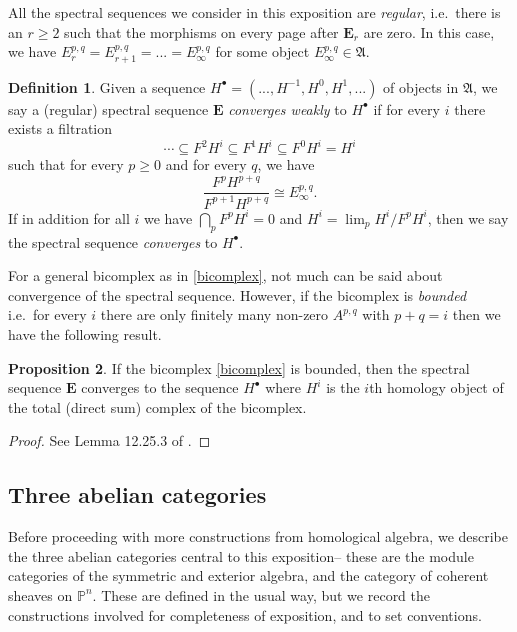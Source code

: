 \documentclass[a4paper]{article}
\theoremstyle{definition}
\newtheorem{defn}{Definition}[section]
\newtheorem{prop}[defn]{Proposition}
\theoremstyle{remark}
\newcommand{\Pn}{\ensuremath{{\mathbb{P}^n}}}
\begin{document}
All the spectral sequences we consider in this exposition are \textit{regular},
i.e.\ there is an \(r\geq 2\) such that the morphisms on every page after
\(\mathbf{E}_r\) are zero. In this case, we have \(E^{p,q}_r = E^{p,q}_{r+1} =
... = E^{p,q}_\infty\) for some object \(E^{p,q}_\infty \in \mathfrak{A}\).

\begin{defn}
    Given a sequence \(H^\bullet=(..., H^{-1},H^0,H^1,...)\) of objects in
    \(\mathfrak{A}\), we say a (regular) spectral sequence \(\mathbf{E}\)
    \textit{converges weakly} to \(H^\bullet\) if for every \(i\) there exists a
    filtration 
    \[\cdots \subseteq F^2H^i \subseteq F^{1}H^i \subseteq F^0H^i =
    H^i \] such that for every \(p\geq 0\) and for every \(q\), we have 
    \[\frac{F^pH^{p+q}}{F^{p+1}H^{p+q}} \cong E^{p,q}_\infty.\]
    If in addition for all \(i\) we have \(\bigcap_pF^pH^i= 0\) and \(H^i =
    \lim_p H^i/F^pH^i\), then we say the spectral sequence \textit{converges} to
    \(H^\bullet\).
\end{defn}

For a general bicomplex as in \eqref{bicomplex}, not much can be said about
convergence of the spectral sequence. However, if the bicomplex is
\textit{bounded} i.e.\ for every \(i\) there are only finitely many non-zero
\(A^{p,q}\) with \(p+q=i\) then we have the following result.

\begin{prop}\label{spectral-convergence}
    If the bicomplex \eqref{bicomplex} is bounded, then the spectral sequence
    \(\mathbf{E}\) converges to the sequence \(H^\bullet\) where \(H^i\) is the
    \(i\)th homology object of the total (direct sum) complex of the bicomplex.
    \begin{proof}
        See Lemma 12.25.3 of .
    \end{proof}
\end{prop}

\subsection{Three abelian categories}

Before proceeding with more constructions from homological algebra, we describe
the three abelian categories central to this exposition-- these are the module
categories of the symmetric and exterior algebra, and the category of coherent
sheaves on \(\Pn\). These are defined in the usual way, but we record the
constructions involved for completeness of exposition, and to set conventions. 
\end{document}
